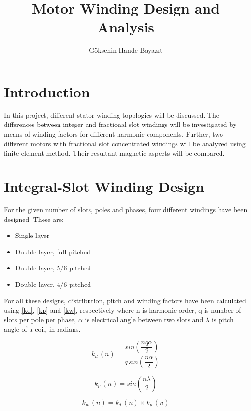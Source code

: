 \documentclass{reportClass}
\title{Motor Winding Design and Analysis}
\author{G\"{o}ksenin Hande Bayazıt}
\begin{document}
\printtitle



\section{Introduction}

In this project, different stator winding topologies will be discussed. The differences between integer and fractional slot windings will be investigated by means of winding factors for different harmonic components. Further, two different motors with fractional slot concentrated windings will be analyzed using finite element method. Their resultant magnetic aspects will be compared.\\

\section{Integral-Slot Winding Design}

For the given number of slots, poles and phases, four different windings have been designed. These are:

\begin{itemize}
    \item Single layer
    \item Double layer, full pitched
    \item Double layer, 5/6 pitched
    \item Double layer, 4/6 pitched
    
\end{itemize}

For all these designs, distribution, pitch and winding factors have been calculated using \ref{kd}, \ref{kp} and \ref{kw}, respectively where n is harmonic order, q is number of slots per pole per phase, $\alpha$ is electrical angle between two slots and $\lambda$ is pitch angle of a coil, in radians.

\begin{equation}
    k_d\,(n) = \dfrac{sin(\dfrac{nq\alpha}{2})}{q\,sin(\dfrac{n\alpha}{2})}  
\label{kd}
\end{equation}

\begin{equation}
    k_p\,(n) = sin(\dfrac{n\lambda}{2})
    \label{kp}
\end{equation}

\begin{equation}
    k_w\,(n) = k_d\,(n)\times k_p\,(n)
    \label{kw}
\end{equation}
\end{document}
